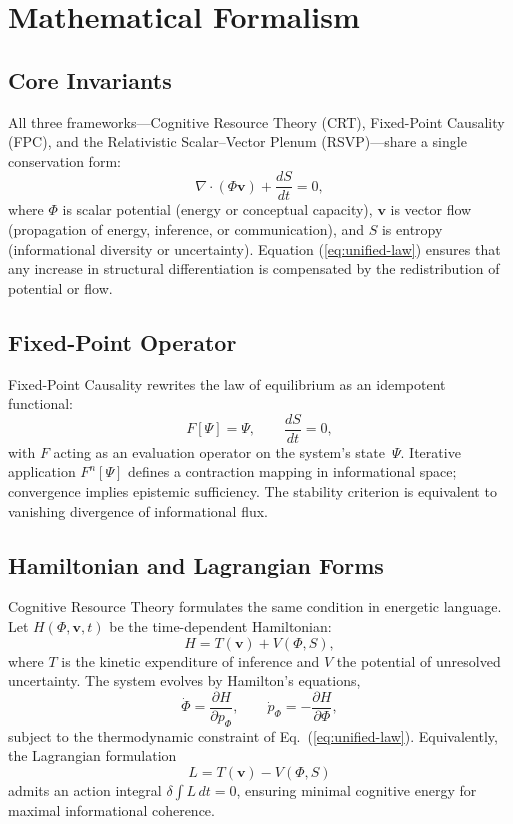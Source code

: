 \documentclass[12pt,a4paper]{article}
\begin{document}
\appendix

\renewcommand{\thesection}{Appendix \Alph{section}}

\section{Mathematical Formalism}

\subsection{Core Invariants}

All three frameworks---Cognitive Resource Theory (CRT), Fixed-Point Causality (FPC), and the Relativistic Scalar–Vector Plenum (RSVP)---share a single conservation form:
\begin{equation}
\nabla\!\cdot(\Phi\mathbf{v})+\frac{dS}{dt}=0,
\label{eq:unified-law}
\end{equation}
where
\(\Phi\) is scalar potential (energy or conceptual capacity),
\(\mathbf{v}\) is vector flow (propagation of energy, inference, or communication),
and \(S\) is entropy (informational diversity or uncertainty).
Equation (\ref{eq:unified-law}) ensures that any increase in structural differentiation is compensated by the redistribution of potential or flow.

\subsection{Fixed-Point Operator}

Fixed-Point Causality rewrites the law of equilibrium as an idempotent functional:
\begin{equation}
F[\Psi]=\Psi,
\qquad
\frac{dS}{dt}=0,
\end{equation}
with \(F\) acting as an evaluation operator on the system’s state~\(\Psi\).
Iterative application \(F^{n}[\Psi]\) defines a contraction mapping in informational space; convergence implies epistemic sufficiency.
The stability criterion is equivalent to vanishing divergence of informational flux.

\subsection{Hamiltonian and Lagrangian Forms}

Cognitive Resource Theory formulates the same condition in energetic language.
Let \(H(\Phi,\mathbf{v},t)\) be the time-dependent Hamiltonian:
\begin{equation}
H = T(\mathbf{v}) + V(\Phi,S),
\end{equation}
where \(T\) is the kinetic expenditure of inference and \(V\) the potential of unresolved uncertainty.
The system evolves by Hamilton’s equations,
\[
\dot{\Phi} = \frac{\partial H}{\partial p_{\Phi}},
\qquad
\dot{p}_{\Phi} = -\frac{\partial H}{\partial \Phi},
\]
subject to the thermodynamic constraint of Eq.~(\ref{eq:unified-law}).
Equivalently, the Lagrangian formulation
\[
L = T(\mathbf{v}) - V(\Phi,S)
\]
admits an action integral
\(\delta\!\int L\,dt=0\),
ensuring minimal cognitive energy for maximal informational coherence.
\end{document}
